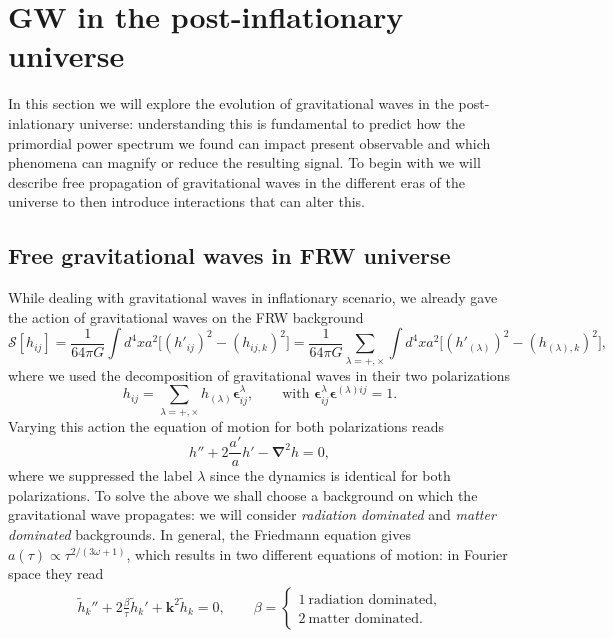 \chapter{GW in the post-inflationary universe}
In this section we will explore the evolution of gravitational waves in the post-inlationary universe: understanding this is fundamental to predict how the primordial power spectrum we found can impact present observable and which phenomena can magnify or reduce the resulting signal. To begin with we will describe free propagation of gravitational waves in the different eras of the universe to then introduce interactions that can alter this.

\section{Free gravitational waves in FRW universe}
While dealing with gravitational waves in inflationary scenario, we already gave the action of gravitational waves on the FRW background
\begin{equation*}
    \mathcal{S} [h_{ij}]=\frac{1}{64\pi G}\int d^4xa^2\Big[(h'_{ij})^2-(h_{ij,k})^2\Big]=\frac{1}{64\pi G}\sum_{\lambda=+,\times}\int d^4xa^2\Big[(h'_{(\lambda)})^2-(h_{(\lambda),k})^2\Big],
\end{equation*}
where we used the decomposition of gravitational waves in their two polarizations
$$h_{ij}=\sum_{\lambda=+,\times}h_{(\lambda)}\boldsymbol\epsilon^\lambda_{ij},\qquad \text{with }\boldsymbol{\epsilon}^\lambda_{ij}\boldsymbol{\epsilon}^{(\lambda) ij}=1.$$
Varying this action the equation of motion for both polarizations reads
\begin{equation}
    h''+2\frac{a'}{a}h'-\boldsymbol{\nabla}^2h=0,\label{eq:EOM_GW_FREE}
\end{equation} 
where we suppressed the label $\lambda$ since the dynamics is identical for both polarizations. To solve the above we shall choose a background on which the gravitational wave propagates: we will consider \emph{radiation dominated} and \emph{matter dominated}  backgrounds. In general, the Friedmann equation gives $a(\tau)\propto\tau^{2/(3\omega+1)}$, which results in two different equations of motion: in Fourier space they read
\begin{align}
    \tilde h_k''+2\frac{\beta}{\tau}\tilde h_k'+\boldsymbol{k}^2\tilde h_k=0,\qquad \beta=\begin{cases}
        1\ \text{radiation dominated,}\\
        2\ \text{matter dominated.}
    \end{cases}\label{eq:GW_Fourier}
\end{align}
